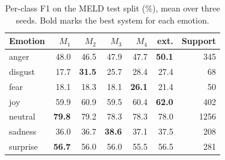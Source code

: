 \begin{table}[t]
\centering
\caption{Per-class F1 on the MELD test split (\%), mean over three seeds. Bold marks the best system for each emotion.}
\label{tab:perclassf1}
\small
\begin{tabular}{lrrrrrr}
\toprule
Emotion & $M_1$ & $M_2$ & $M_3$ & $M_4$ & ext. & Support \\
\midrule
anger & 48.0 & 46.5 & 47.9 & 47.7 & \textbf{50.1} & 345 \\
disgust & 17.7 & \textbf{31.5} & 25.7 & 28.4 & 27.4 & 68 \\
fear & 18.1 & 18.3 & 18.1 & \textbf{26.1} & 21.4 & 50 \\
joy & 59.9 & 60.9 & 59.5 & 60.4 & \textbf{62.0} & 402 \\
neutral & \textbf{79.8} & 79.2 & 78.3 & 78.3 & 78.0 & 1256 \\
sadness & 36.0 & 36.7 & \textbf{38.6} & 37.1 & 37.5 & 208 \\
surprise & \textbf{56.7} & 56.0 & 56.0 & 55.5 & 56.5 & 281 \\
\bottomrule
\end{tabular}
\end{table}